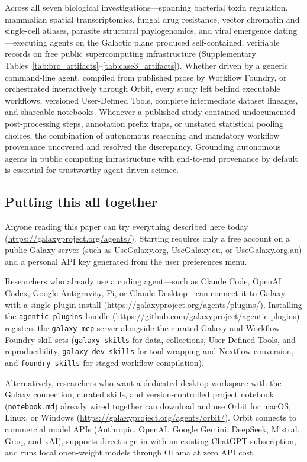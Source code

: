 \documentclass[11pt,letterpaper]{article}
\begin{document}
Across all seven biological investigations---spanning bacterial toxin regulation, mammalian spatial transcriptomics, fungal drug resistance, vector chromatin and single-cell atlases, parasite structural phylogenomics, and viral emergence dating---executing agents on the Galactic plane produced self-contained, verifiable records on free public supercomputing infrastructure (Supplementary Tables~\ref{tab:brc_artifacts}--\ref{tab:case3_artifacts}). Whether driven by a generic command-line agent, compiled from published prose by Workflow Foundry, or orchestrated interactively through Orbit, every study left behind executable workflows, versioned User-Defined Tools, complete intermediate dataset lineages, and shareable notebooks. Whenever a published study contained undocumented post-processing steps, annotation prefix traps, or unstated statistical pooling choices, the combination of autonomous reasoning and mandatory workflow provenance uncovered and resolved the discrepancy. Grounding autonomous agents in public computing infrastructure with end-to-end provenance by default is essential for trustworthy agent-driven science.

\subsection{Putting this all together}

Anyone reading this paper can try everything described here today (\url{https://galaxyproject.org/agents/}). Starting requires only a free account on a public Galaxy server (such as UseGalaxy.org, UseGalaxy.eu, or UseGalaxy.org.au) and a personal API key generated from the user preferences menu.

Researchers who already use a coding agent---such as Claude Code, OpenAI Codex, Google Antigravity, Pi, or Claude Desktop---can connect it to Galaxy with a single plugin install (\url{https://galaxyproject.org/agents/plugins/}). Installing the \texttt{agentic-plugins} bundle (\url{https://github.com/galaxyproject/agentic-plugins}) registers the \texttt{galaxy-mcp} server alongside the curated Galaxy and Workflow Foundry skill sets (\texttt{galaxy-skills} for data, collections, User-Defined Tools, and reproducibility, \texttt{galaxy-dev-skills} for tool wrapping and Nextflow conversion, and \texttt{foundry-skills} for staged workflow compilation).

Alternatively, researchers who want a dedicated desktop workspace with the Galaxy connection, curated skills, and version-controlled project notebook (\texttt{notebook.md}) already wired together can download and use Orbit for macOS, Linux, or Windows (\url{https://galaxyproject.org/agents/orbit/}). Orbit connects to commercial model APIs (Anthropic, OpenAI, Google Gemini, DeepSeek, Mistral, Groq, and xAI), supports direct sign-in with an existing ChatGPT subscription, and runs local open-weight models through Ollama at zero API cost.
\end{document}
